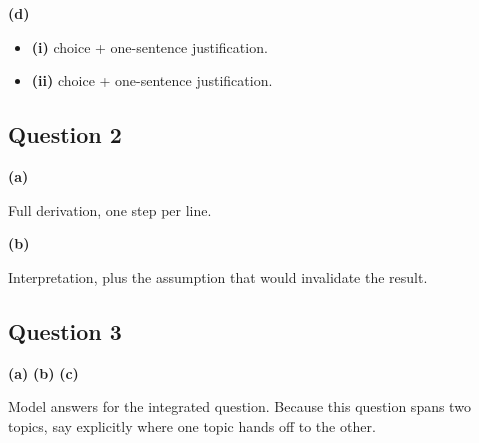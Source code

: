 \textbf{(d)}
\begin{ans}
\begin{itemize}
    \item \textbf{(i)} choice + one-sentence justification.
    \item \textbf{(ii)} choice + one-sentence justification.
\end{itemize}
\end{ans}

\vspace{4mm}

\subsection*{Question 2}

\textbf{(a)}
\begin{ans}
Full derivation, one step per line.
\end{ans}

\textbf{(b)}
\begin{ans}
Interpretation, plus the assumption that would invalidate the result.
\end{ans}

\vspace{4mm}

\subsection*{Question 3}

\textbf{(a)} \quad \textbf{(b)} \quad \textbf{(c)}
\begin{ans}
Model answers for the integrated question. Because this question spans two
topics, say explicitly where one topic hands off to the other.
\end{ans}
